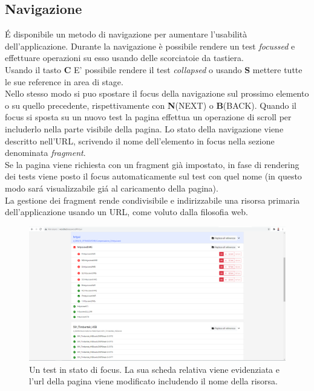             \subsection{Navigazione}
                \'E disponibile un metodo di navigazione per aumentare l'usabilità dell'applicazione.
                Durante la navigazione è possibile rendere un test \textit{focussed} e effettuare operazioni su esso usando delle scorciatoie da tastiera.\\
                Usando il tasto \textbf{C} E' possibile rendere il test \textit{collapsed} o usando \textbf{S} mettere tutte le sue reference in area di stage.\\ 
                Nello stesso modo si puo spostare il focus della navigazione sul prossimo elemento o su quello precedente, rispettivamente con \textbf{N}(NEXT) o \textbf{B}(BACK).
                Quando il focus si sposta su un nuovo test la pagina effettua un operazione di scroll per includerlo nella parte visibile della pagina.
                Lo stato della navigazione viene descritto nell'URL, scrivendo il nome dell'elemento in focus nella sezione denominata \textit{fragment}.\\
                Se la pagina viene richiesta con un fragment già impostato, in fase di rendering dei tests viene posto il focus automaticamente sul test con quel nome (in questo modo sar\'a visualizzabile gi\'a al caricamento della pagina).\\
                La gestione dei fragment rende condivisibile e indirizzabile una risorsa primaria dell'applicazione usando un URL, come voluto dalla filosofia web. 
            
            \begin{figure}
                \includegraphics[width=\textwidth]{images/active.png}
                \caption{Un test in stato di focus. La sua scheda relativa viene evidenziata e l'url della pagina viene modificato includendo il nome della risorsa.}
            \end{figure}
